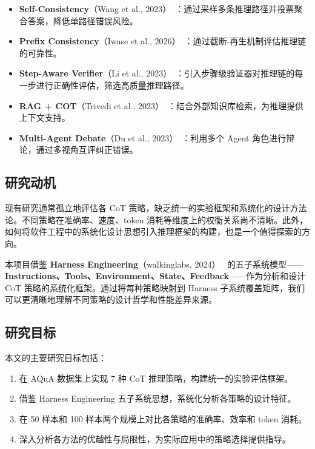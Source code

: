 \documentclass[lang=cn,a4paper,newtx]{elegantpaper}
\begin{document}
\begin{itemize}
  \item \textbf{Self-Consistency}（Wang et al., 2023）~\cite{wang2023sc}：通过采样多条推理路径并投票聚合答案，降低单路径错误风险。
  \item \textbf{Prefix Consistency}（Iwase et al., 2026）~\cite{yu2025pc}：通过截断-再生机制评估推理链的可靠性。
  \item \textbf{Step-Aware Verifier}（Li et al., 2023）~\cite{li2023verifier}：引入步骤级验证器对推理链的每一步进行正确性评估，筛选高质量推理路径。
  \item \textbf{RAG + COT}（Trivedi et al., 2023）~\cite{trivedi2022ragcot}：结合外部知识库检索，为推理提供上下文支持。
  \item \textbf{Multi-Agent Debate}（Du et al., 2023）~\cite{du2023mad}：利用多个 Agent 角色进行辩论，通过多视角互评纠正错误。
\end{itemize}

\subsection{研究动机}

现有研究通常孤立地评估各 CoT 策略，缺乏统一的实验框架和系统化的设计方法论。不同策略在准确率、速度、token 消耗等维度上的权衡关系尚不清晰。此外，如何将软件工程中的系统化设计思想引入推理框架的构建，也是一个值得探索的方向。

本项目借鉴 \textbf{Harness Engineering}（walkinglabs, 2024）~\cite{walkinglabs2024harness} 的五子系统模型——\textbf{Instructions、Tools、Environment、State、Feedback}——作为分析和设计 CoT 策略的系统化框架。通过将每种策略映射到 Harness 子系统覆盖矩阵，我们可以更清晰地理解不同策略的设计哲学和性能差异来源。

\subsection{研究目标}

本文的主要研究目标包括：

\begin{enumerate}
  \item 在 AQuA 数据集上实现 7 种 CoT 推理策略，构建统一的实验评估框架。
  \item 借鉴 Harness Engineering 五子系统思想，系统化分析各策略的设计特征。
  \item 在 50 样本和 100 样本两个规模上对比各策略的准确率、效率和 token 消耗。
  \item 深入分析各方法的优越性与局限性，为实际应用中的策略选择提供指导。
\end{enumerate}
\end{document}
